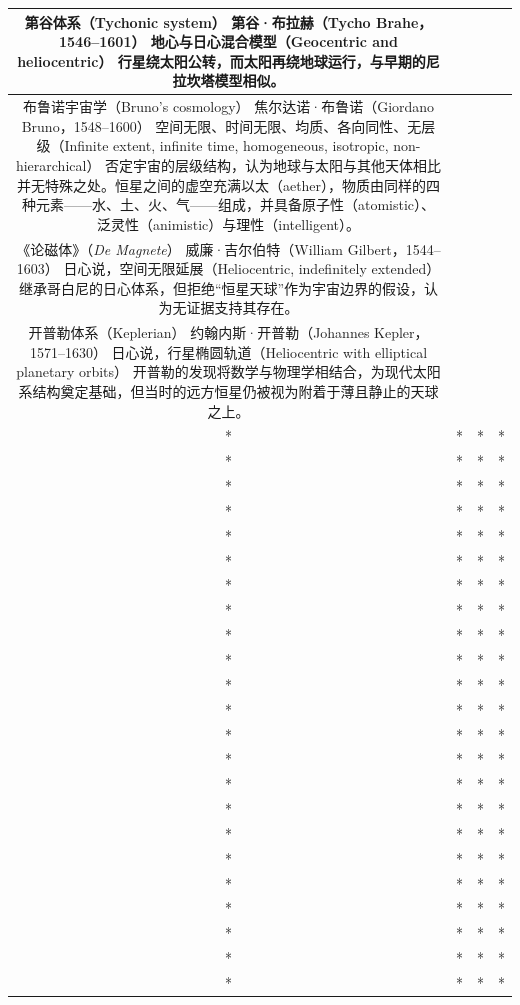 \begin{table}[ht]
\begin{tabular}{|c|c|c|c|}
\hline
第谷体系（Tychonic system） \quad 第谷·布拉赫（Tycho Brahe，1546–1601） \quad 地心与日心混合模型（Geocentric and heliocentric） \quad 行星绕太阳公转，而太阳再绕地球运行，与早期的尼拉坎塔模型相似。\\
\hline
布鲁诺宇宙学（Bruno's cosmology） \quad 焦尔达诺·布鲁诺（Giordano Bruno，1548–1600） \quad 空间无限、时间无限、均质、各向同性、无层级（Infinite extent, infinite time, homogeneous, isotropic, non-hierarchical） \quad 否定宇宙的层级结构，认为地球与太阳与其他天体相比并无特殊之处。恒星之间的虚空充满以太（aether），物质由同样的四种元素——水、土、火、气——组成，并具备原子性（atomistic）、泛灵性（animistic）与理性（intelligent）。\\
\hline
《论磁体》（\emph{De Magnete}） \quad 威廉·吉尔伯特（William Gilbert，1544–1603） \quad 日心说，空间无限延展（Heliocentric, indefinitely extended） \quad 继承哥白尼的日心体系，但拒绝“恒星天球”作为宇宙边界的假设，认为无证据支持其存在。\cite{ref47}\\
\hline
开普勒体系（Keplerian） \quad 约翰内斯·开普勒（Johannes Kepler，1571–1630） \quad 日心说，行星椭圆轨道（Heliocentric with elliptical planetary orbits） \quad 开普勒的发现将数学与物理学相结合，为现代太阳系结构奠定基础，但当时的远方恒星仍被视为附着于薄且静止的天球之上。\\
\hline
* & * & * & * \\
\hline
* & * & * & * \\
\hline
* & * & * & * \\
\hline
* & * & * & * \\
\hline
* & * & * & * \\
\hline
* & * & * & * \\
\hline
* & * & * & * \\
\hline
* & * & * & * \\
\hline
* & * & * & * \\
\hline
* & * & * & * \\
\hline
* & * & * & * \\
\hline
* & * & * & * \\
\hline
* & * & * & * \\
\hline
* & * & * & * \\
\hline
* & * & * & * \\
\hline
* & * & * & * \\
\hline
* & * & * & * \\
\hline
* & * & * & * \\
\hline
* & * & * & * \\
\hline
* & * & * & * \\
\hline
* & * & * & * \\
\hline
* & * & * & * \\
\hline
* & * & * & * \\
\hline
\end{tabular}
\end{table}

